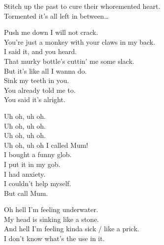 Stitch up the past to cure their whoremented heart. \\

Tormented  it's all left in between… \\




Push me down I will not crack. \\
You're just a monkey with your claws in my back. \\
I said it, and you heard. \\
That murky bottle's cuttin' me some slack. \\

But it's like all I wanna do. \\
Sink my teeth in you. \\
You already told me to. \\
You said it's alright. \\




Uh oh, uh oh. \\
Uh oh, uh oh. \\
Uh oh, uh oh. \\
Uh oh, uh oh I called Mum! \\

I bought a funny glob. \\
I put it in my gob. \\
I had anxiety. \\
I couldn't help myself. \\
But call Mum. \\




Oh hell I'm feeling underwater. \\
My head is sinking like a stone. \\

And hell I'm feeling kinda sick / like a prick. \\
I don't know what's the use in it. \\

